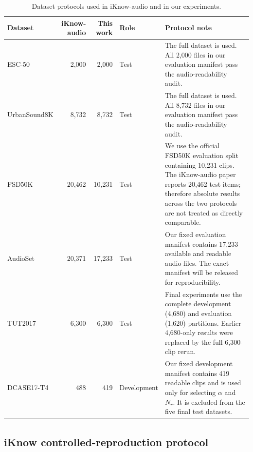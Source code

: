 \begin{table}[H]
\centering
\caption{Dataset protocols used in iKnow-audio and in our experiments.}
\label{tab:dataset-reconciliation}
\fontsize{7.5}{8.2}\selectfont
\setlength{\tabcolsep}{4pt}
\begin{tabular}{lrrlp{}}
\toprule
Dataset & iKnow-audio & This work & Role & Protocol note \\
\midrule
ESC-50 & 2,000 & 2,000 & Test & The full dataset is used. All 2,000 files in our evaluation manifest pass the audio-readability audit. \\
UrbanSound8K & 8,732 & 8,732 & Test & The full dataset is used. All 8,732 files in our evaluation manifest pass the audio-readability audit. \\
FSD50K & 20,462 & 10,231 & Test & We use the official FSD50K evaluation split containing 10,231 clips. The iKnow-audio paper reports 20,462 test items; therefore absolute results across the two protocols are not treated as directly comparable. \\
AudioSet & 20,371 & 17,233 & Test & Our fixed evaluation manifest contains 17,233 available and readable audio files. The exact manifest will be released for reproducibility. \\
TUT2017 & 6,300 & 6,300 & Test & Final experiments use the complete development (4,680) and evaluation (1,620) partitions. Earlier 4,680-only results were replaced by the full 6,300-clip rerun. \\
DCASE17-T4 & 488 & 419 & Development & Our fixed development manifest contains 419 readable clips and is used only for selecting $\alpha$ and $N_r$. It is excluded from the five final test datasets. \\
\bottomrule
\end{tabular}
\end{table}

\subsection{iKnow\textsuperscript{\dag} controlled-reproduction protocol}

